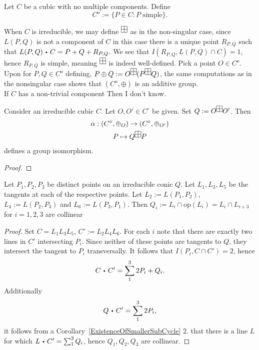     \begin{definition}
        Let $C$ be a cubic with no multiple components. Define 
        $$C^o := \{ P\in C : P \text{ simple} \}.$$
    \end{definition}
    \begin{remark}
        When $C$ is irreducible, we may define $\squareplus$ as in the non-singular case, since $L(P,Q)$ is not a component of $C$ in this case there is a unique point $R_{P,Q}$ such that $L(P,Q)\ic C = P+Q+R_{P,Q}$. We see that $I(R_{P,Q}, L(P,Q)\cap C)=1$, hence $R_{P,Q}$ is simple, meaning $\squareplus$ is indeed well-defined. Pick a point $O\in C^o$. Upon for $P,Q\in C^o$ defining, $P\oplus Q := O \squareplus (P \squareplus Q)$, the same computations as in the nonsingular case shows that $(C^o,\oplus)$ is an additive group.\\
        If $C$ has a non-trivial component {\Large Then I don't know}.
    \end{remark}
    \begin{proposition}
        Consider an irreducible cubic $C$. Let $O,O'\in C^\circ$ be given. Set $Q:= O\squareplus O'$. Then 
        \begin{gather*}
            \alpha : (C^\circ, \oplus_O) \rightarrow (C^\circ, \oplus_{O'})\\
            P \mapsto Q \squareplus P
        \end{gather*}
        defines a group isomorphism. 
    \end{proposition}
    \begin{proof}
        
    \end{proof}
    \begin{proposition}
        Let $P_1,P_2,P_3$ be distinct points on an irreducible conic $Q$. Let $L_1,L_3,L_5$ be the tangents at each of the respective points. Let $L_{2}:=L(P_1,P_2)$, $L_4:= L(P_2,P_3)$ and $L_6:= L(P_3,P_1)$. Then $Q_i := L_i\cap \mathrm{op}(L_i)=L_i\cap L_{i+3}$ for $i=1,2,3$ are collinear
    \end{proposition}
    \begin{proof}
        Set $C=L_{1}L_{3}L_{5}$, $C':= L_2L_4L_6$. For each $i$ note that there are exactly two lines in $C'$ intersecting $P_i$. Since neither of these points are tangents to $Q$, they intersect the tangent to $P_i$ transversally. It follows that $I(P_i,C\cap C')= 2$, hence 
        $$C\ic C' = \sum_1^3 2P_i+Q_i.$$
        Additionally 
        $$Q\ic C' = \sum_1^3 2P_i,$$
        it follows from a Corollary~\ref{ExistenceOfSmallerSubCycle} 2. that there is a line $L$ for which $L\ic C' = \sum_1^3 Q_i$, hence $Q_1,Q_2,Q_3$ are collinear.
    \end{proof}
